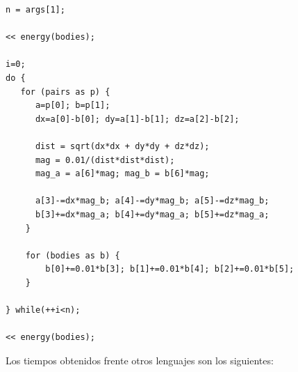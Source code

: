 \begin{lstlisting}
n = args[1];

<< energy(bodies);

i=0; 
do {
   for (pairs as p) {
      a=p[0]; b=p[1];
      dx=a[0]-b[0]; dy=a[1]-b[1]; dz=a[2]-b[2];

      dist = sqrt(dx*dx + dy*dy + dz*dz);
      mag = 0.01/(dist*dist*dist);
      mag_a = a[6]*mag; mag_b = b[6]*mag;
	
      a[3]-=dx*mag_b; a[4]-=dy*mag_b; a[5]-=dz*mag_b;
      b[3]+=dx*mag_a; b[4]+=dy*mag_a; b[5]+=dz*mag_a;
    } 

    for (bodies as b) {
        b[0]+=0.01*b[3]; b[1]+=0.01*b[4]; b[2]+=0.01*b[5];
    } 

} while(++i<n);

<< energy(bodies);
\end{lstlisting}

Los tiempos obtenidos frente otros lenguajes son los siguientes: 

